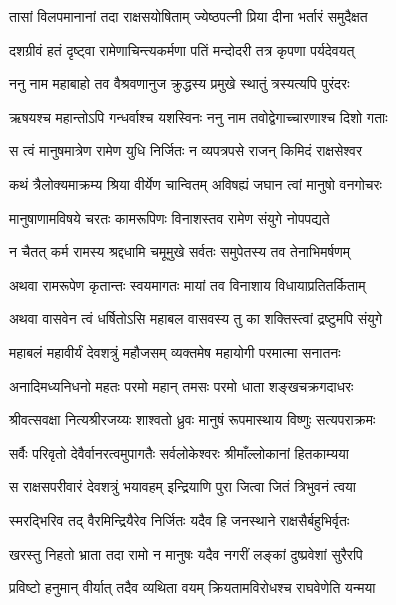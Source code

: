 
\twolineshloka
{तासां विलपमानानां तदा राक्षसयोषिताम्}
{ज्येष्ठपत्नी प्रिया दीना भर्तारं समुदैक्षत} %

\twolineshloka
{दशग्रीवं हतं दृष्ट्वा रामेणाचिन्त्यकर्मणा}
{पतिं मन्दोदरी तत्र कृपणा पर्यदेवयत्} %

\twolineshloka
{ननु नाम महाबाहो तव वैश्रवणानुज}
{क्रुद्धस्य प्रमुखे स्थातुं त्रस्यत्यपि पुरंदरः} %

\twolineshloka
{ऋषयश्च महान्तोऽपि गन्धर्वाश्च यशस्विनः}
{ननु नाम तवोद्वेगाच्चारणाश्च दिशो गताः} %

\twolineshloka
{स त्वं मानुषमात्रेण रामेण युधि निर्जितः}
{न व्यपत्रपसे राजन् किमिदं राक्षसेश्वर} %

\twolineshloka
{कथं त्रैलोक्यमाक्रम्य श्रिया वीर्येण चान्वितम्}
{अविषह्यं जघान त्वां मानुषो वनगोचरः} %

\twolineshloka
{मानुषाणामविषये चरतः कामरूपिणः}
{विनाशस्तव रामेण संयुगे नोपपद्यते} %

\twolineshloka
{न चैतत् कर्म रामस्य श्रद्दधामि चमूमुखे}
{सर्वतः समुपेतस्य तव तेनाभिमर्षणम्} %

\twolineshloka
{अथवा रामरूपेण कृतान्तः स्वयमागतः}
{मायां तव विनाशाय विधायाप्रतितर्किताम्} %

\twolineshloka
{अथवा वासवेन त्वं धर्षितोऽसि महाबल}
{वासवस्य तु का शक्तिस्त्वां द्रष्टुमपि संयुगे} %

\twolineshloka
{महाबलं महावीर्यं देवशत्रुं महौजसम्}
{व्यक्तमेष महायोगी परमात्मा सनातनः} %

\twolineshloka
{अनादिमध्यनिधनो महतः परमो महान्}
{तमसः परमो धाता शङ्खचक्रगदाधरः} %

\twolineshloka
{श्रीवत्सवक्षा नित्यश्रीरजय्यः शाश्वतो ध्रुवः}
{मानुषं रूपमास्थाय विष्णुः सत्यपराक्रमः} %

\twolineshloka
{सर्वैः परिवृतो देवैर्वानरत्वमुपागतैः}
{सर्वलोकेश्वरः श्रीमाँल्लोकानां हितकाम्यया} %

\twolineshloka
{स राक्षसपरीवारं देवशत्रुं भयावहम्}
{इन्द्रियाणि पुरा जित्वा जितं त्रिभुवनं त्वया} %

\twolineshloka
{स्मरद्भिरिव तद् वैरमिन्द्रियैरेव निर्जितः}
{यदैव हि जनस्थाने राक्षसैर्बहुभिर्वृतः} %

\twolineshloka
{खरस्तु निहतो भ्राता तदा रामो न मानुषः}
{यदैव नगरीं लङ्कां दुष्प्रवेशां सुरैरपि} %

\twolineshloka
{प्रविष्टो हनुमान् वीर्यात् तदैव व्यथिता वयम्}
{क्रियतामविरोधश्च राघवेणेति यन्मया} %

